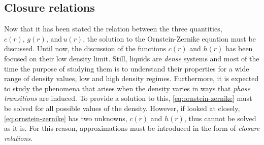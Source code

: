 \subsection{Closure relations}
Now that it has been stated the relation between the three quantities, 
$c(r), \, g(r), \, \text{and} \, u(r)$, the solution to the Ornstein-Zernike equation
must be discussed. Until now, the discussion of the functions $c(r)$ and $h(r)$ has been
focused on their low density limit. Still, liquids are \emph{dense} systems and most of
the time the purpose of studying them is to understand their properties for a wide range
of density values, low and high density regimes. 
Furthermore, it is expected to study the phenomena that
arises when the density varies in ways that \emph{phase transitions} are induced.
To provide a solution to this, \autoref{eq:ornstein-zernike} must be solved for all possible
values of the density. However, if looked at closely, \autoref{eq:ornstein-zernike} has
two unknowns, $c(r)$ and $h(r)$, thus cannot be solved as it is. For this reason,
approximations must be introduced in the form of \emph{closure relations}.

